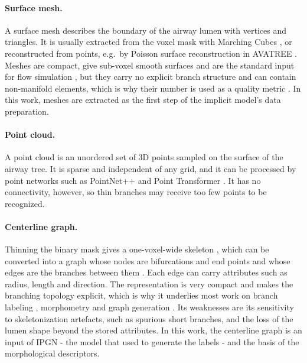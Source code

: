 \paragraph{Surface mesh.}                %
A surface mesh describes the boundary of the airway lumen with vertices and triangles. It is
usually extracted from the voxel mask with Marching Cubes \cite{lorensen1987}, or
reconstructed from points, e.g.\ by Poisson surface reconstruction in AVATREE
\cite{nousias2020avatree}. Meshes are compact, give sub-voxel smooth surfaces and are the
standard input for flow simulation \cite{lauria2022,ho2024}, but they carry no explicit branch
structure and can contain non-manifold elements, which is why their number is used as a
quality metric \cite{zhang2024}. In this work, meshes are extracted as the first step of the
implicit model's data preparation.

\paragraph{Point cloud.}                 %
A point cloud is an unordered set of 3D points sampled on the surface of the airway tree. It
is sparse and independent of any grid, and it can be processed by point networks such as
PointNet++ \cite{qi2017} and Point Transformer \cite{zhao2021}. It has no connectivity, however,
so thin branches may receive too few points to be recognized. 

\paragraph{Centerline graph.}            %
Thinning the binary mask gives a one-voxel-wide skeleton \cite{lee1994,palagyi2006}, which can
be converted into a graph whose nodes are bifurcations and end points and whose edges are the
branches between them \cite{bumgarner2022}. Each edge can carry attributes such as radius,
length and direction. The representation is very compact and makes the branching topology
explicit, which is why it underlies most work on branch labeling
\cite{tschirren2005matching,feragen2011airway,xie2025}, morphometry
\cite{kaji2024airway,zhang2025airmorph} and graph generation \cite{prabhakar2024vesselgraph}.
Its weaknesses are its sensitivity to skeletonization artefacts, such as spurious short branches,
and the loss of the lumen shape beyond the stored attributes. In this work, the centerline
graph is an input of IPGN - the model that used to generate the labels - and the basis of the morphological
descriptors.

